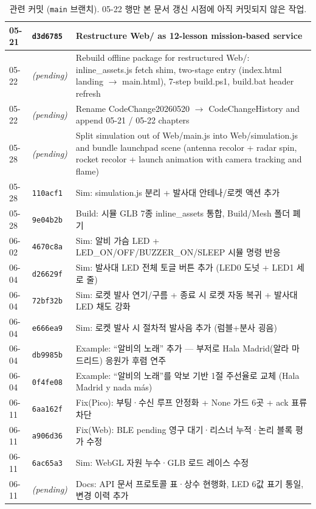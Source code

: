 \documentclass[11pt, oneside]{article}
\begin{document}
\begin{table}[h]
\begin{tabularx}{\linewidth}{@{}llX@{}}
05-21 & \texttt{d3d6785} & Restructure Web/ as 12-lesson mission-based service \\
\midrule
05-22 & \textit{(pending)} & Rebuild offline package for restructured Web/: inline\_assets.js fetch shim, two-stage entry (index.html landing $\to$ main.html), 7-step build.ps1, build.bat header refresh \\
05-22 & \textit{(pending)} & Rename CodeChange20260520 $\to$ CodeChangeHistory and append 05-21 / 05-22 chapters \\
\midrule
05-28 & \textit{(pending)} & Split simulation out of Web/main.js into Web/simulation.js and bundle launchpad scene (antenna recolor + radar spin, rocket recolor + launch animation with camera tracking and flame) \\
05-28 & \texttt{110acf1} & Sim: simulation.js 분리 + 발사대 안테나/로켓 액션 추가 \\
05-28 & \texttt{9e04b2b} & Build: 시뮬 GLB 7종 inline\_assets 통합, Build/Mesh 폴더 폐기 \\
\midrule
06-02 & \texttt{4670c8a} & Sim: 알비 가슴 LED + LED\_ON/OFF/BUZZER\_ON/SLEEP 시뮬 명령 반응 \\
\midrule
06-04 & \texttt{d26629f} & Sim: 발사대 LED 전체 토글 버튼 추가 (LED0 도넛 + LED1\textendash 5 세로 줄) \\
06-04 & \texttt{72bf32b} & Sim: 로켓 발사 연기/구름 + 종료 시 로켓 자동 복귀 + 발사대 LED 채도 강화 \\
06-04 & \texttt{e666ea9} & Sim: 로켓 발사 시 절차적 발사음 추가 (럼블+분사 굉음) \\
06-04 & \texttt{db9985b} & Example: ``알비의 노래'' 추가 --- 부저로 Hala Madrid(알라 마드리드) 응원가 후렴 연주 \\
06-04 & \texttt{0f4fe08} & Example: ``알비의 노래''를 악보 기반 1절 주선율로 교체 (Hala Madrid y nada más) \\
\midrule
06-11 & \texttt{6aa162f} & Fix(Pico): 부팅·수신 루프 안정화 + None 가드 6곳 + ack 표류 차단 \\
06-11 & \texttt{a906d36} & Fix(Web): BLE pending 영구 대기·리스너 누적·논리 블록 평가 수정 \\
06-11 & \texttt{6ac65a3} & Sim: WebGL 자원 누수·GLB 로드 레이스 수정 \\
06-11 & \textit{(pending)} & Docs: API 문서 프로토콜 표·상수 현행화, LED 6값 표기 통일, 변경 이력 추가 \\
\bottomrule
\end{tabularx}
\caption{관련 커밋 (\texttt{main} 브랜치). 05-22 행만 본 문서 갱신 시점에 아직 커밋되지 않은 작업.}
\end{table}
\end{document}
